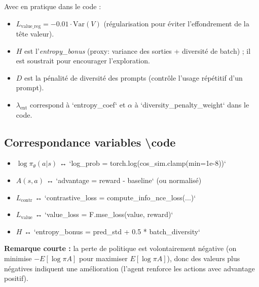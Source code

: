\documentclass[a4paper,11pt]{article}
\begin{document}
Avec en pratique dans le code :
\begin{itemize}
  \item $L_{\text{value\_reg}} = -0.01\cdot\mathrm{Var}(V)$ (régularisation pour éviter l'effondrement de la tête valeur).
  \item $H$ est l'\emph{entropy\_bonus} (proxy: variance des sorties + diversité de batch) ; il est soustrait pour encourager l'exploration.
  \item $D$ est la pénalité de diversité des prompts (contrôle l'usage répétitif d'un prompt).
  \item $\lambda_{\text{ent}}$ correspond à `entropy_coef` et $\alpha$ à `diversity_penalty_weight` dans le code.
\end{itemize}

\subsection*{Correspondance variables \textbackslash code}
\begin{itemize}
  \item $\log \pi_\theta(a|s)$ \;↔\; `log_prob = torch.log(cos_sim.clamp(min=1e-8))`
  \item $A(s,a)$ \;↔\; `advantage = reward - baseline` (ou normalisé)
  \item $L_{\text{contr}}$ \;↔\; `contrastive_loss = compute_info_nce_loss(...)`
  \item $L_{\text{value}}$ \;↔\; `value_loss = F.mse_loss(value, reward)`
  \item $H$ \;↔\; `entropy_bonus = pred_std + 0.5 * batch_diversity`
\end{itemize}

\vspace{6pt}
\noindent \textbf{Remarque courte :} la perte de politique est volontairement négative (on minimise $-E[\log \pi A]$ pour maximiser $E[\log \pi A]$), donc des valeurs plus négatives indiquent une amélioration (l'agent renforce les actions avec advantage positif).
\end{document}
